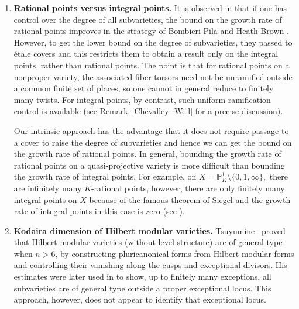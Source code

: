 \documentclass[12 pt]{amsart}
\theoremstyle{definition}
\begin{document}
\begin{enumerate}[leftmargin=*]
The torsion level covers considered here behave differently.
The space \(X_1(\eta)\) parametrizes a single torsion point rather than a
full level structure, and the map
\(
X_1(\eta)\to X(1)
\)
does not have uniformly increasing ramification at all cusps. This
phenomenon already occurs for modular curves: the map
\(X_1(p)\to X(1)\) has \((p-1)/2\) cusps that are unramified; see
\cite[p.~26]{shimura1971introduction} and
\cite{ogg1972rational}. Thus, the standard argument for the full level
covers cannot be applied directly to the torsion level covers.

 \item\textbf{Rational points versus integral points.} 
It is observed in \cite{ellenberg2023sparsity,brunebarbe2022counting} that if one has control over the degree of all subvarieties, the bound on the growth rate of rational points improves in the strategy of Bombieri-Pila \cite{bombieri1989number} and Heath-Brown \cite{heath2002density}. However, to get the lower bound on the degree of subvarieties, they passed to \'etale covers and this restricts them to obtain a result only on the integral points, rather than rational points. The point is that for rational points on a nonproper variety, the associated
fiber torsors need not be unramified outside a common finite set of places,
so one cannot in general reduce to finitely many twists. For integral points,
by contrast, such uniform ramification control is available
(see Remark~\ref{Chevalley--Weil} for a precise discussion).

Our intrinsic approach has the advantage that it does not require passage to a cover to raise the degree of subvarieties and hence we can get the bound on the growth rate of rational points.
    In general, bounding the growth rate of rational points on a quasi-projective variety is more difficult than bounding the growth rate of integral points. For example, on $X=\mathbb{P}_{K}^1\setminus \{0,1,\infty\},$ there are infinitely many $K$-rational points, however, there are only finitely many integral points on $X$ because of the famous theorem of Siegel and the growth rate of integral points in this case is zero (see \cite[Remark 3.3]{brunebarbe2022counting}). 


\item \textbf{Kodaira dimension of Hilbert modular varieties.}
Tsuyumine~\cite{tsuyumine1985kodaira} proved that Hilbert modular varieties
(without level structure) are of general type when \(n>6\), by constructing
pluricanonical forms from Hilbert modular forms and controlling their vanishing
along the cusps and exceptional divisors. His estimates were later used in
\cite[Theorem~D]{cadorel2019hyperbolicity} to show, up to finitely many exceptions, all subvarieties are of general type outside a
proper exceptional locus. This approach, however, does not appear to identify
that exceptional locus.


\end{enumerate}
\end{document}
